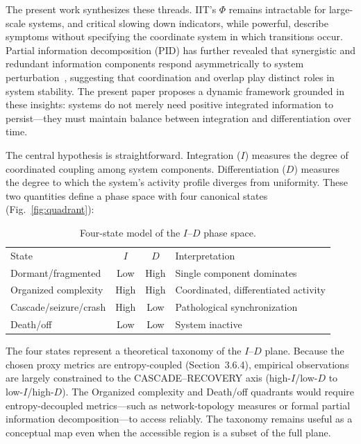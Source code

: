 \documentclass[aip,cha,reprint,amsmath,amssymb,final]{revtex4-2}
\begin{document}
The present work synthesizes these threads. IIT's $\Phi$ remains intractable for large-scale systems, and critical slowing down indicators, while powerful, describe symptoms without specifying the coordinate system in which transitions occur. Partial information decomposition (PID) has further revealed that synergistic and redundant information components respond asymmetrically to system perturbation~\cite{williams2010,popiel2020}, suggesting that coordination and overlap play distinct roles in system stability. The present paper proposes a dynamic framework grounded in these insights: systems do not merely need positive integrated information to persist---they must maintain balance between integration and differentiation over time.

The central hypothesis is straightforward. Integration ($I$) measures the degree of coordinated coupling among system components. Differentiation ($D$) measures the degree to which the system's activity profile diverges from uniformity. These two quantities define a phase space with four canonical states (Fig.~\ref{fig:quadrant}):

\begin{table}[!htbp]
\caption[Four-state model of the I-D phase space]{\label{tab:four_state}Four-state model of the $I$--$D$ phase space.}
\begin{ruledtabular}
\begin{tabular}{p{2.8cm}ccp{3.0cm}}
State & $I$ & $D$ & Interpretation \\
Dormant/fragmented & Low & High & Single component dominates \\
Organized complexity & High & High & Coordinated, differentiated activity \\
Cascade/seizure/crash & High & Low & Pathological synchronization \\
Death/off & Low & Low & System inactive \\
\end{tabular}
\end{ruledtabular}
\end{table}

The four states represent a theoretical taxonomy of the $I$--$D$ plane. Because the chosen proxy metrics are entropy-coupled (Section~3.6.4), empirical observations are largely constrained to the CASCADE--RECOVERY axis (high-$I$/low-$D$ to low-$I$/high-$D$). The Organized complexity and Death/off quadrants would require entropy-decoupled metrics---such as network-topology measures or formal partial information decomposition---to access reliably. The taxonomy remains useful as a conceptual map even when the accessible region is a subset of the full plane.
\end{document}
